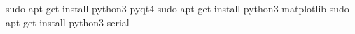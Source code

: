 sudo apt-get install python3-pyqt4
sudo apt-get install python3-matplotlib
sudo apt-get install python3-serial